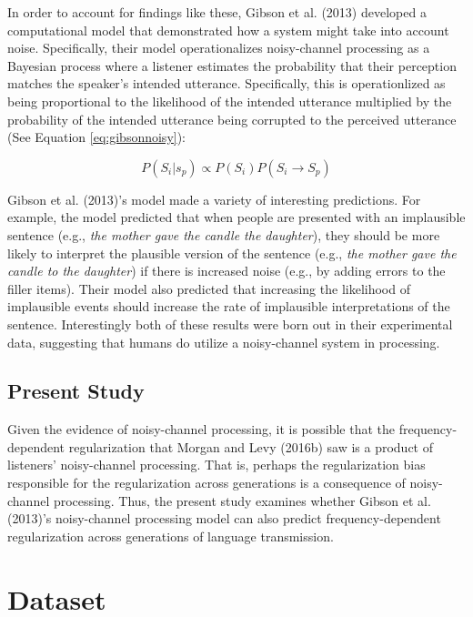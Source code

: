 \documentclass[
  jou,floatsintext]{apa6}
\begin{document}
In order to account for findings like these, Gibson et al. (2013) developed a computational model that demonstrated how a system might take into account noise. Specifically, their model operationalizes noisy-channel processing as a Bayesian process where a listener estimates the probability that their perception matches the speaker's intended utterance. Specifically, this is operationlized as being proportional to the likelihood of the intended utterance multiplied by the probability of the intended utterance being corrupted to the perceived utterance (See Equation \eqref{eq:gibsonnoisy}):

\begin{equation}
\label{eq:gibsonnoisy}
P(S_i|s_p) \propto P(S_i) P(S_i \to S_p)
\end{equation}

Gibson et al. (2013)'s model made a variety of interesting predictions. For example, the model predicted that when people are presented with an implausible sentence (e.g., \emph{the mother gave the candle the daughter}), they should be more likely to interpret the plausible version of the sentence (e.g., \emph{the mother gave the candle to the daughter}) if there is increased noise (e.g., by adding errors to the filler items). Their model also predicted that increasing the likelihood of implausible events should increase the rate of implausible interpretations of the sentence. Interestingly both of these results were born out in their experimental data, suggesting that humans do utilize a noisy-channel system in processing.

\subsection{Present Study}\label{present-study}

Given the evidence of noisy-channel processing, it is possible that the frequency-dependent regularization that Morgan and Levy (2016b) saw is a product of listeners' noisy-channel processing. That is, perhaps the regularization bias responsible for the regularization across generations is a consequence of noisy-channel processing. Thus, the present study examines whether Gibson et al. (2013)'s noisy-channel processing model can also predict frequency-dependent regularization across generations of language transmission.

\section{Dataset}\label{dataset}
\end{document}
